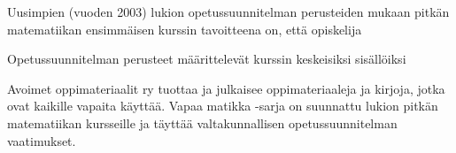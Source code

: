 Uusimpien (vuoden 2003) lukion opetussuunnitelman perusteiden mukaan pitkän matematiikan ensimmäisen kurssin tavoitteena on, että opiskelija

Opetussuunnitelman perusteet määrittelevät kurssin keskeisiksi sisällöiksi

Avoimet oppimateriaalit ry tuottaa ja julkaisee oppimateriaaleja ja kirjoja, jotka ovat kaikille vapaita käyttää. Vapaa matikka -sarja on suunnattu lukion pitkän matematiikan kursseille ja täyttää valtakunnallisen opetussuunnitelman vaatimukset.
